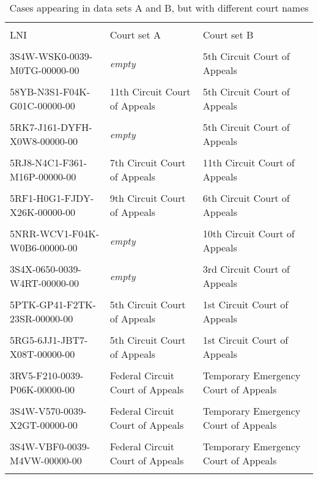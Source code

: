 \documentclass[10pt, letterpaper]{article}
\begin{document}
\begin{spacing}{1.0}
\begin{table}[H]
    \centering
    \caption{Cases appearing in data sets A and B, but with different court names}
    \footnotesize
    \begin{tabular}{llp{2.25in}}
        \hline\\[-6pt]
        LNI & Court set A & Court set B\\[4pt]
        \hline\\[-6pt]
        3S4W-WSK0-0039-M0TG-00000-00 & \textit{empty} & 5th Circuit Court of Appeals\\\\[-4pt]
        58YB-N3S1-F04K-G01C-00000-00 & 11th Circuit Court of Appeals & 5th Circuit Court of Appeals\\\\[-4pt]
        5RK7-J161-DYFH-X0W8-00000-00 & \textit{empty} & 5th Circuit Court of Appeals\\\\[-4pt]
        5RJ8-N4C1-F361-M16P-00000-00 & 7th Circuit Court of Appeals & 11th Circuit Court of Appeals\\\\[-4pt]
        5RF1-H0G1-FJDY-X26K-00000-00 & 9th Circuit Court of Appeals & 6th Circuit Court of Appeals\\\\[-4pt]
        5NRR-WCV1-F04K-W0B6-00000-00 & \textit{empty} & 10th Circuit Court of Appeals\\\\[-4pt]
        3S4X-0650-0039-W4RT-00000-00 & \textit{empty} & 3rd Circuit Court of Appeals\\\\[-4pt]
        5PTK-GP41-F2TK-23SR-00000-00 & 5th Circuit Court of Appeals & 1st Circuit Court of Appeals\\\\[-4pt]
        5RG5-6JJ1-JBT7-X08T-00000-00 & 5th Circuit Court of Appeals & 1st Circuit Court of Appeals\\\\[-4pt]
        3RV5-F210-0039-P06K-00000-00 & Federal Circuit Court of Appeals & Temporary Emergency Court of Appeals\\\\[-4pt]
        3S4W-V570-0039-X2GT-00000-00 & Federal Circuit Court of Appeals & Temporary Emergency Court of Appeals\\\\[-4pt]
        3S4W-VBF0-0039-M4VW-00000-00 & Federal Circuit Court of Appeals & Temporary Emergency Court of Appeals\\\\[-4pt]

\end{tabular}
\end{table}
\end{spacing}
\end{document}

